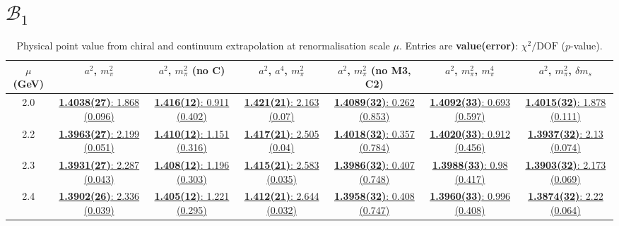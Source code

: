 \documentclass[12pt]{extarticle}
\begin{document}
\section{$\mathcal{B}_1$}
\begin{table}[h!]
\begin{center}
\begin{tabular}{|c|c|c|c|c|c|c|}
\hline
$\mu$ (GeV) & $a^2$, $m_\pi^2$& $a^2$, $m_\pi^2$ (no C)& $a^2$, $a^4$, $m_\pi^2$& $a^2$, $m_\pi^2$ (no M3, C2)& $a^2$, $m_\pi^2$, $m_\pi^4$& $a^2$, $m_\pi^2$, $\delta m_s$\\
\hline
2.0& \hyperlink{VVpAA/NPR/a2m2_20.pdf.1}{\textbf{1.4038(27)}: 1.868 (0.096)} & \hyperlink{VVpAA/NPR/a2m2noC_20.pdf.1}{\textbf{1.416(12)}: 0.911 (0.402)} & \hyperlink{VVpAA/NPR/a2a4m2_20.pdf.1}{\textbf{1.421(21)}: 2.163 (0.07)} & \hyperlink{VVpAA/NPR/a2m2mcut_20.pdf.1}{\textbf{1.4089(32)}: 0.262 (0.853)} & \hyperlink{VVpAA/NPR/a2m2m4_20.pdf.1}{\textbf{1.4092(33)}: 0.693 (0.597)} & \hyperlink{VVpAA/NPR/a2m2delm_20.pdf.1}{\textbf{1.4015(32)}: 1.878 (0.111)}\\
2.2& \hyperlink{VVpAA/NPR/a2m2_22.pdf.1}{\textbf{1.3963(27)}: 2.199 (0.051)} & \hyperlink{VVpAA/NPR/a2m2noC_22.pdf.1}{\textbf{1.410(12)}: 1.151 (0.316)} & \hyperlink{VVpAA/NPR/a2a4m2_22.pdf.1}{\textbf{1.417(21)}: 2.505 (0.04)} & \hyperlink{VVpAA/NPR/a2m2mcut_22.pdf.1}{\textbf{1.4018(32)}: 0.357 (0.784)} & \hyperlink{VVpAA/NPR/a2m2m4_22.pdf.1}{\textbf{1.4020(33)}: 0.912 (0.456)} & \hyperlink{VVpAA/NPR/a2m2delm_22.pdf.1}{\textbf{1.3937(32)}: 2.13 (0.074)}\\
2.3& \hyperlink{VVpAA/NPR/a2m2_23.pdf.1}{\textbf{1.3931(27)}: 2.287 (0.043)} & \hyperlink{VVpAA/NPR/a2m2noC_23.pdf.1}{\textbf{1.408(12)}: 1.196 (0.303)} & \hyperlink{VVpAA/NPR/a2a4m2_23.pdf.1}{\textbf{1.415(21)}: 2.583 (0.035)} & \hyperlink{VVpAA/NPR/a2m2mcut_23.pdf.1}{\textbf{1.3986(32)}: 0.407 (0.748)} & \hyperlink{VVpAA/NPR/a2m2m4_23.pdf.1}{\textbf{1.3988(33)}: 0.98 (0.417)} & \hyperlink{VVpAA/NPR/a2m2delm_23.pdf.1}{\textbf{1.3903(32)}: 2.173 (0.069)}\\
2.4& \hyperlink{VVpAA/NPR/a2m2_24.pdf.1}{\textbf{1.3902(26)}: 2.336 (0.039)} & \hyperlink{VVpAA/NPR/a2m2noC_24.pdf.1}{\textbf{1.405(12)}: 1.221 (0.295)} & \hyperlink{VVpAA/NPR/a2a4m2_24.pdf.1}{\textbf{1.412(21)}: 2.644 (0.032)} & \hyperlink{VVpAA/NPR/a2m2mcut_24.pdf.1}{\textbf{1.3958(32)}: 0.408 (0.747)} & \hyperlink{VVpAA/NPR/a2m2m4_24.pdf.1}{\textbf{1.3960(33)}: 0.996 (0.408)} & \hyperlink{VVpAA/NPR/a2m2delm_24.pdf.1}{\textbf{1.3874(32)}: 2.22 (0.064)}\\
\hline
\end{tabular}
\caption{Physical point value from chiral and continuum extrapolation at renormalisation scale $\mu$. Entries are \textbf{value(error)}: $\chi^2/\text{DOF}$ ($p$-value).}
\end{center}
\end{table}
\end{document}
